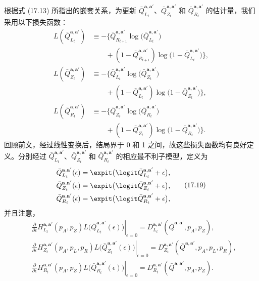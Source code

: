 根据式 (17.13) 所指出的嵌套关系，为更新 $\bar Q_{L_t}^{\mathbf a,\mathbf a'}$、$\bar Q_{Z_t}^{\mathbf a,\mathbf a'}$ 和 $\bar Q_{R_t}^{\mathbf a,\mathbf a'}$ 的估计量，我们采用以下损失函数：
\begin{equation}
\begin{aligned}
 L(\bar Q_{L_t}^{\mathbf a,\mathbf a'})
 &\equiv-\bigl\{\bar Q_{R_{t+1}}^{\mathbf a,\mathbf a'}\log\bigl(\bar Q_{L_t}^{\mathbf a,\mathbf a'}\bigr)\\
 &\qquad{}+(1-\bar Q_{R_{t+1}}^{\mathbf a,\mathbf a'})\log\bigl(1-\bar Q_{L_t}^{\mathbf a,\mathbf a'}\bigr)\bigr\},\\
 L(\bar Q_{Z_t}^{\mathbf a,\mathbf a'})
 &\equiv-\bigl\{\bar Q_{L_t}^{\mathbf a,\mathbf a'}\log\bigl(\bar Q_{Z_t}^{\mathbf a,\mathbf a'}\bigr)\\
 &\qquad{}+(1-\bar Q_{L_t}^{\mathbf a,\mathbf a'})\log\bigl(1-\bar Q_{Z_t}^{\mathbf a,\mathbf a'}\bigr)\bigr\},\\
 L(\bar Q_{R_t}^{\mathbf a,\mathbf a'})
 &\equiv-\bigl\{\bar Q_{Z_t}^{\mathbf a,\mathbf a'}\log\bigl(\bar Q_{R_t}^{\mathbf a,\mathbf a'}\bigr)\\
 &\qquad{}+(1-\bar Q_{Z_t}^{\mathbf a,\mathbf a'})\log\bigl(1-\bar Q_{R_t}^{\mathbf a,\mathbf a'}\bigr)\bigr\}.
\end{aligned}
\tag{17.18}
\end{equation}
回顾前文，经过线性变换后，结局界于 0 和 1 之间，故这些损失函数均有良好定义。分别经过 $\bar Q_{L_t}^{\mathbf a,\mathbf a'}$、$\bar Q_{Z_t}^{\mathbf a,\mathbf a'}$ 和 $\bar Q_{R_t}^{\mathbf a,\mathbf a'}$ 的相应最不利子模型，定义为
\begin{equation}
\begin{aligned}
 \bar Q_{L_t}^{\mathbf a,\mathbf a'}(\epsilon)
 &=\expit\bigl(\logit\bar Q_{L_t}^{\mathbf a,\mathbf a'}+\epsilon\bigr),\\
 \bar Q_{Z_t}^{\mathbf a,\mathbf a'}(\epsilon)
 &=\expit\bigl(\logit\bar Q_{Z_t}^{\mathbf a,\mathbf a'}+\epsilon\bigr),\\
 \bar Q_{R_t}^{\mathbf a,\mathbf a'}(\epsilon)
 &=\expit\bigl(\logit\bar Q_{R_t}^{\mathbf a,\mathbf a'}+\epsilon\bigr),
\end{aligned}
\tag{17.19}
\end{equation}
并且注意，
\[
\begin{aligned}
 &\left.\frac{\partial}{\partial\epsilon}
 H_{L_t}^{\mathbf a,\mathbf a'}(p_A,p_Z)
 L\bigl(\bar Q_{L_t}^{\mathbf a,\mathbf a'}(\epsilon)\bigr)\right|_{\epsilon=0}
 =D_{L_t}^{\mathbf a,\mathbf a'}(\bar Q^{\mathbf a,\mathbf a'},p_A,p_Z),\\
 &\left.\frac{\partial}{\partial\epsilon}
 H_{Z_t}^{\mathbf a,\mathbf a'}(p_A,p_L,p_R)
 L\bigl(\bar Q_{Z_t}^{\mathbf a,\mathbf a'}(\epsilon)\bigr)\right|_{\epsilon=0}
 =D_{Z_t}^{\mathbf a,\mathbf a'}(\bar Q^{\mathbf a,\mathbf a'},p_A,p_L,p_R),\\
 &\left.\frac{\partial}{\partial\epsilon}
 H_{R_t}^{\mathbf a,\mathbf a'}(p_A,p_Z)
 L\bigl(\bar Q_{R_t}^{\mathbf a,\mathbf a'}(\epsilon)\bigr)\right|_{\epsilon=0}
 =D_{R_t}^{\mathbf a,\mathbf a'}(\bar Q^{\mathbf a,\mathbf a'},p_A,p_Z).
\end{aligned}
\]

